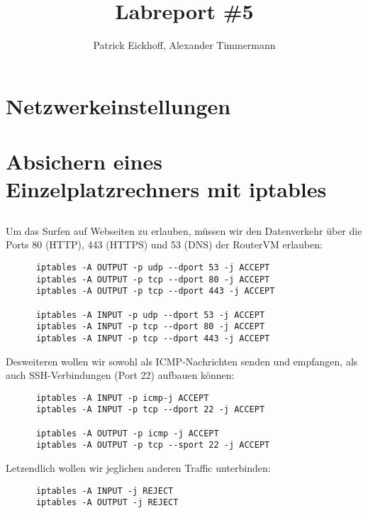 \documentclass{scrartcl}
\author{Patrick Eickhoff, Alexander Timmermann}
\title{Labreport \#5}
\date{}
\begin{document}
    \maketitle
    \section{Netzwerkeinstellungen}
    \label{sec:Netzwerkeinstellungen}

    \section{Absichern eines Einzelplatzrechners mit iptables}
    \label{sec:Absichern eines Einzelplatzrechners mit iptables}

    \setcounter{subsection}{1}
    \subsection{}
    \label{sub:2.2}

    Um das Surfen auf Webseiten zu erlauben, müssen wir den Datenverkehr über
    die Ports 80 (HTTP), 443 (HTTPS) und 53 (DNS) der RouterVM erlauben:
    \begin{lstlisting}
      iptables -A OUTPUT -p udp --dport 53 -j ACCEPT
      iptables -A OUTPUT -p tcp --dport 80 -j ACCEPT
      iptables -A OUTPUT -p tcp --dport 443 -j ACCEPT

      iptables -A INPUT -p udp --dport 53 -j ACCEPT
      iptables -A INPUT -p tcp --dport 80 -j ACCEPT
      iptables -A INPUT -p tcp --dport 443 -j ACCEPT
    \end{lstlisting}
    Desweiteren wollen wir sowohl als ICMP-Nachrichten senden und
    empfangen, als auch SSH-Verbindungen (Port 22) aufbauen können:
    \begin{lstlisting}
      iptables -A INPUT -p icmp-j ACCEPT
      iptables -A INPUT -p tcp --dport 22 -j ACCEPT

      iptables -A OUTPUT -p icmp -j ACCEPT
      iptables -A OUTPUT -p tcp --sport 22 -j ACCEPT
    \end{lstlisting}
    Letzendlich wollen wir jeglichen anderen Traffic unterbinden:
    \begin{lstlisting}
      iptables -A INPUT -j REJECT
      iptables -A OUTPUT -j REJECT
    \end{lstlisting}
\end{document}
